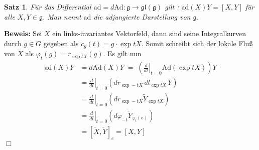 \documentclass[12pt,a4paper]{article}
\def\Ad{\mathrm{Ad}}
\def\ad{\mathrm{ad}}
\def\g{\mathfrak{g}}
\def\gl{\mathfrak{gl}}
\def\ad{\mathrm{ad}}
\newtheorem{Satz}[Lemma]{Satz}
\def\proof{\noindent\textbf{Beweis:}\quad}
\def\qed{\quad\hfill\ensuremath{\Box}}
\begin{document}
\begin{Satz}\label{ad}
F\"ur das Differential $\ad = d \Ad : \g \rightarrow \gl(\g) $ gilt : $\ad(X)Y = [X,Y]$ f\"ur alle
$X,Y\in \g$. Man nennt $\ad$ die {\em adjungierte Darstellung} von $\g$.
\end{Satz}
\proof
Sei $X$ ein links-invariantes Vektorfeld, dann sind seine Integralkurven durch $g\in G$  gegeben als
$c_g(t) = g \cdot \exp t X$. Somit schreibt sich der lokale Flu\ss{} von $X$ als
$\varphi_t(g) = r_{\exp tX}(g)$.  Es gilt nun
$$
\begin{array}{ll}
\ad(X)Y &= d\Ad(X) Y \; = \;
\left( \left. \tfrac{d}{dt}\right|_{t=0} \Ad(\exp tX) \right) Y\\[1.5ex]
&=
\left. \tfrac{d}{dt}\right|_{t=0}  \left(dr_{\exp -tX} \, dl_{\exp tX}\, Y\right) \\[1.5ex]
&=
\left. \tfrac{d}{dt}\right|_{t=0}  \left(  dr_{\exp -tX} \tilde Y_{\exp tX} \right) \\[1.5ex]
&=
\left. \tfrac{d}{dt}\right|_{t=0} \left( d\varphi_{-t} \tilde Y_{\varphi_t(e)} \right)\\[1.5ex]
&=
[\tilde X, \tilde Y]_e = [X,Y]
\end{array}
$$
\qed


\bigskip
\end{document}
